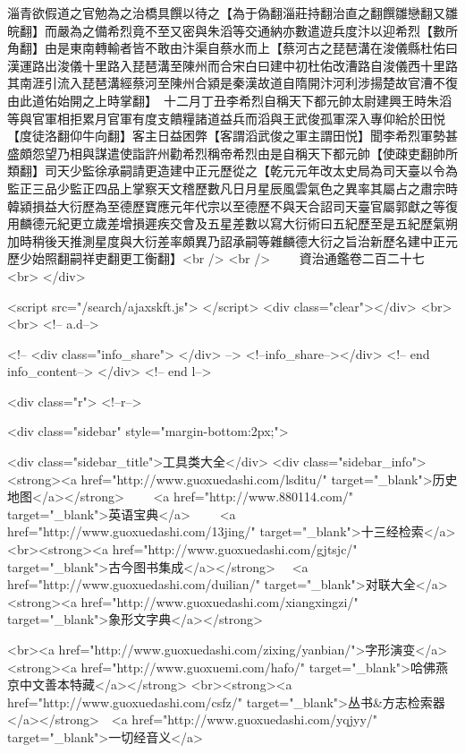 淄青欲假道之官勉為之治橋具饌以待之【為于偽翻淄莊持翻治直之翻饌雛戀翻又雛皖翻】而嚴為之備希烈竟不至又密與朱滔等交通納亦數遣遊兵度汴以迎希烈【數所角翻】由是東南轉輸者皆不敢由汴渠自蔡水而上【蔡河古之琵琶溝在浚儀縣杜佑曰漢運路出浚儀十里路入琵琶溝至陳州而合宋白曰建中初杜佑改漕路自浚儀西十里路其南涯引流入琵琶溝經蔡河至陳州合潁是秦漢故道自隋開汴河利涉揚楚故官漕不復由此道佑始開之上時掌翻】　十二月丁丑李希烈自稱天下都元帥太尉建興王時朱滔等與官軍相拒累月官軍有度支饋糧諸道益兵而滔與王武俊孤軍深入專仰給於田悦【度徒洛翻仰牛向翻】客主日益困弊【客謂滔武俊之軍主謂田悦】聞李希烈軍勢甚盛頗怨望乃相與謀遣使詣許州勸希烈稱帝希烈由是自稱天下都元帥【使疎吏翻帥所類翻】司天少監徐承嗣請更造建中正元歷從之【乾元元年改太史局為司天臺以令為監正三品少監正四品上掌察天文稽歷數凡日月星辰風雲氣色之異率其屬占之肅宗時韓潁損益大衍歷為至德歷寶應元年代宗以至德歷不與天合詔司天臺官屬郭獻之等復用麟德元紀更立歲差增損遲疾交會及五星差數以寫大衍術曰五紀歷至是五紀歷氣朔加時稍後天推測星度與大衍差率頗異乃詔承嗣等雜麟德大衍之旨治新歷名建中正元歷少始照翻嗣祥吏翻更工衡翻】<br />
<br />
　　資治通鑑卷二百二十七  <br>
   </div> 

<script src="/search/ajaxskft.js"> </script>
 <div class="clear"></div>
<br>
<br>
 <!-- a.d-->

 <!--
<div class="info_share">
</div> 
-->
 <!--info_share--></div>   <!-- end info_content-->
  </div> <!-- end l-->

<div class="r">   <!--r-->



<div class="sidebar"  style="margin-bottom:2px;">

 
<div class="sidebar_title">工具类大全</div>
<div class="sidebar_info">
<strong><a href="http://www.guoxuedashi.com/lsditu/" target="_blank">历史地图</a></strong>　　
<a href="http://www.880114.com/" target="_blank">英语宝典</a>　　
<a href="http://www.guoxuedashi.com/13jing/" target="_blank">十三经检索</a>　
<br><strong><a href="http://www.guoxuedashi.com/gjtsjc/" target="_blank">古今图书集成</a></strong>　
<a href="http://www.guoxuedashi.com/duilian/" target="_blank">对联大全</a>　<strong><a href="http://www.guoxuedashi.com/xiangxingzi/" target="_blank">象形文字典</a></strong>　

<br><a href="http://www.guoxuedashi.com/zixing/yanbian/">字形演变</a>　　<strong><a href="http://www.guoxuemi.com/hafo/" target="_blank">哈佛燕京中文善本特藏</a></strong>
<br><strong><a href="http://www.guoxuedashi.com/csfz/" target="_blank">丛书&方志检索器</a></strong>　<a href="http://www.guoxuedashi.com/yqjyy/" target="_blank">一切经音义</a>　　

